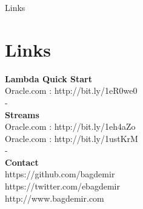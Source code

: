 \documentclass{beamer}
\begin{document}
	\begin{frame}[fragile]{Links}
		\section{Links}
		
		\textbf{Lambda Quick Start}\\
		Oracle.com : http://bit.ly/1eR0we0 \\
		-\\
		\textbf{Streams}\\
		Oracle.com : http://bit.ly/1eh4aZo\\
		Oracle.com : http://bit.ly/1ustKrM\\
		-\\
		\textbf{Contact}\\
		https://github.com/bagdemir\\
		https://twitter.com/ebagdemir\\
		http://www.bagdemir.com\\

	\end{frame}	
	
\end{document}

